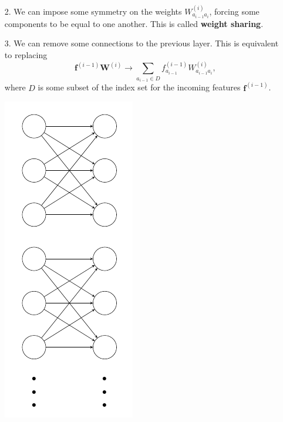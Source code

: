 \documentclass[12pt,t]{beamer}
\begin{document}
\begin{frame}
\begin{itemize}
\item[2.]  We can impose some symmetry on the weights $W^{(i)}_{a_{i-1}a_i}$, forcing some components to be equal to one another. This is called {\bf weight sharing}.
\item[3.] We can remove some connections to the previous layer. This is equivalent to replacing 
$$ \mathbf{f}^{(i-1)} \mathbf{W}^{(i)} \rightarrow \sum_{a_{i-1} \in D} f^{(i-1)}_{a_{i-1}} W^{(i)}_{a_{i-1}a_i},$$
where $D$ is some subset of the index set for the incoming features $\mathbf{f}^{(i-1)}$. 
\centerline{
\includegraphics[height=0.4\textheight]{./images/semiconnect.png}
} 
\end{itemize}
\end{frame}
\end{document}
